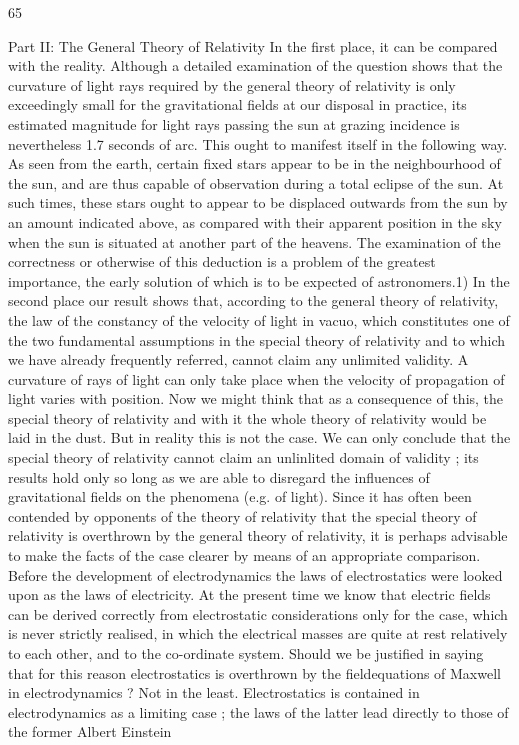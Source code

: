 \documentclass{article}
\begin{document}
65

Part II: The General Theory of Relativity
In the first place, it can be compared with the reality. Although a detailed examination of
the question shows that the curvature of light rays required by the general theory of
relativity is only exceedingly small for the gravitational fields at our disposal in practice, its
estimated magnitude for light rays passing the sun at grazing incidence is nevertheless 1.7
seconds of arc. This ought to manifest itself in the following way. As seen from the earth,
certain fixed stars appear to be in the neighbourhood of the sun, and are thus capable of
observation during a total eclipse of the sun. At such times, these stars ought to appear to be
displaced outwards from the sun by an amount indicated above, as compared with their
apparent position in the sky when the sun is situated at another part of the heavens. The
examination of the correctness or otherwise of this deduction is a problem of the greatest
importance, the early solution of which is to be expected of astronomers.1)
In the second place our result shows that, according to the general theory of relativity, the
law of the constancy of the velocity of light in vacuo, which constitutes one of the two
fundamental assumptions in the special theory of relativity and to which we have already
frequently referred, cannot claim any unlimited validity. A curvature of rays of light can
only take place when the velocity of propagation of light varies with position. Now we
might think that as a consequence of this, the special theory of relativity and with it the
whole theory of relativity would be laid in the dust. But in reality this is not the case. We
can only conclude that the special theory of relativity cannot claim an unlinlited domain of
validity ; its results hold only so long as we are able to disregard the influences of
gravitational fields on the phenomena (e.g. of light).
Since it has often been contended by opponents of the theory of relativity that the special
theory of relativity is overthrown by the general theory of relativity, it is perhaps advisable
to make the facts of the case clearer by means of an appropriate comparison. Before the
development of electrodynamics the laws of electrostatics were looked upon as the laws of
electricity. At the present time we know that electric fields can be derived correctly from
electrostatic considerations only for the case, which is never strictly realised, in which the
electrical masses are quite at rest relatively to each other, and to the co-ordinate system.
Should we be justified in saying that for this reason electrostatics is overthrown by the fieldequations of Maxwell in electrodynamics ? Not in the least. Electrostatics is contained in
electrodynamics as a limiting case ; the laws of the latter lead directly to those of the former
Albert Einstein
\end{document}
